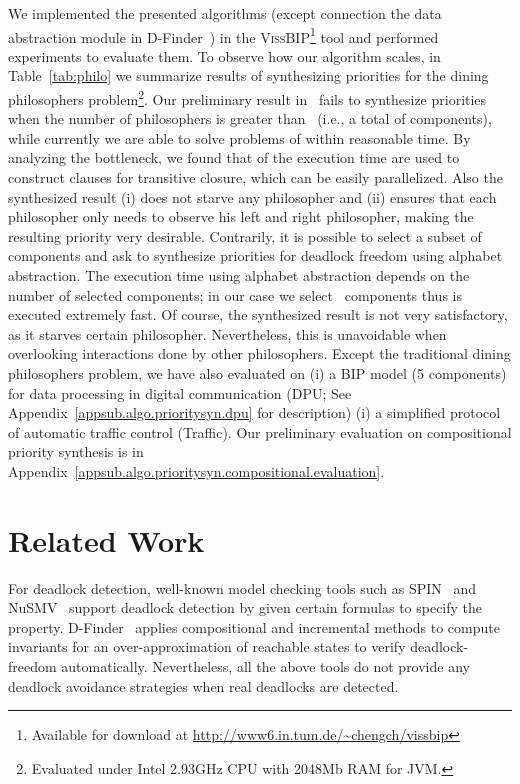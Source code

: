 \documentclass[10pt, a4paper, onecolumn, conference, compsocconf]{IEEEtran}
\begin{document}
We implemented the presented algorithms (except connection the data abstraction module in D-Finder~\cite{bensalem:dfinder2:2011}) in the \textsc{VissBIP}\footnote{Available for download at \url{http://www6.in.tum.de/~chengch/vissbip}} tool and performed experiments to evaluate them. To observe how our algorithm scales, in Table~\ref{tab:philo} we summarize results of synthesizing priorities for the dining philosophers problem\footnote{Evaluated under Intel 2.93GHz CPU with 2048Mb RAM for JVM.}. Our preliminary result in~\cite{cheng:vissbip:2011} fails to synthesize priorities when the number of philosophers is greater than~ (i.e., a total of  components), while currently we are able to solve problems of  within reasonable time. By analyzing the bottleneck, we found that  of the execution time are used to construct clauses for transitive closure, which can be easily parallelized. Also the synthesized result (i) does not starve any philosopher and (ii) ensures that each philosopher only needs to observe his left and right philosopher, making the resulting priority very desirable. Contrarily, it is possible to select a subset of components and ask to synthesize priorities for deadlock freedom using alphabet abstraction. The execution time using alphabet abstraction depends on the number of selected components; in our case we select~ components thus is executed extremely fast. Of course, the synthesized result is not very satisfactory, as it starves certain philosopher. Nevertheless, this is unavoidable when overlooking interactions done by other philosophers.
Except the traditional dining philosophers problem, we have also evaluated on  (i) a BIP model (5 components) for data processing in digital communication (DPU; See Appendix~\ref{appsub.algo.prioritysyn.dpu} for description) (i) a simplified protocol of automatic traffic control (Traffic). Our preliminary evaluation on compositional priority synthesis is in Appendix~\ref{appsub.algo.prioritysyn.compositional.evaluation}.

\section{Related Work\label{sec.algo.prioritysyn.related}}

For deadlock detection, well-known model checking tools such as SPIN~\cite{holzmann:2004:smc} and NuSMV~\cite{cimatti1999nns} support deadlock detection by given certain formulas to specify the property.  D-Finder~\cite{bensalem:dfinder2:2011} applies compositional and incremental methods to compute invariants for an over-approximation of reachable states to verify deadlock-freedom automatically. Nevertheless, all the above tools do not provide any deadlock avoidance strategies when real deadlocks are detected.
\end{document}

